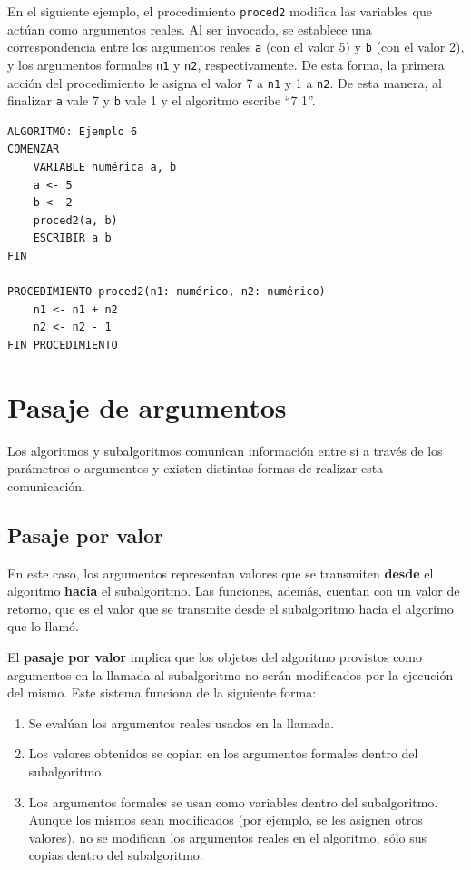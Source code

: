\documentclass[]{book}
\providecommand{\tightlist}{%
  \setlength{\itemsep}{0pt}\setlength{\parskip}{0pt}}
\begin{document}
En el siguiente ejemplo, el procedimiento \texttt{proced2} modifica las variables que actúan como argumentos reales. Al ser invocado, se establece una correspondencia entre los argumentos reales \texttt{a} (con el valor 5) y \texttt{b} (con el valor 2), y los argumentos formales \texttt{n1} y \texttt{n2}, respectivamente. De esta forma, la primera acción del procedimiento le asigna el valor 7 a \texttt{n1} y 1 a \texttt{n2}. De esta manera, al finalizar \texttt{a} vale 7 y \texttt{b} vale 1 y el algoritmo escribe ``7 1''.

\begin{verbatim}
ALGORITMO: Ejemplo 6
COMENZAR
    VARIABLE numérica a, b
    a <- 5
    b <- 2
    proced2(a, b)
    ESCRIBIR a b
FIN

PROCEDIMIENTO proced2(n1: numérico, n2: numérico)
    n1 <- n1 + n2
    n2 <- n2 - 1
FIN PROCEDIMIENTO
\end{verbatim}

\hypertarget{pasaje-de-argumentos}{%
\section{Pasaje de argumentos}\label{pasaje-de-argumentos}}

Los algoritmos y subalgoritmos comunican información entre sí a través de los parámetros o argumentos y existen distintas formas de realizar esta comunicación.

\hypertarget{pasaje-por-valor}{%
\subsection{Pasaje por valor}\label{pasaje-por-valor}}

En este caso, los argumentos representan valores que se transmiten \textbf{desde} el algoritmo \textbf{hacia} el subalgoritmo. Las funciones, además, cuentan con un valor de retorno, que es el valor que se transmite desde el subalgoritmo hacia el algorimo que lo llamó.

El \textbf{pasaje por valor} implica que los objetos del algoritmo provistos como argumentos en la llamada al subalgoritmo no serán modificados por la ejecución del mismo. Este sistema funciona de la siguiente forma:

\begin{enumerate}
\def\labelenumi{\arabic{enumi}.}
\tightlist
\item
  Se evalúan los argumentos reales usados en la llamada.
\item
  Los valores obtenidos se copian en los argumentos formales dentro del subalgoritmo.
\item
  Los argumentos formales se usan como variables dentro del subalgoritmo. Aunque los mismos sean modificados (por ejemplo, se les asignen otros valores), no se modifican los argumentos reales en el algoritmo, sólo sus copias dentro del subalgoritmo.
\end{enumerate}
\end{document}
